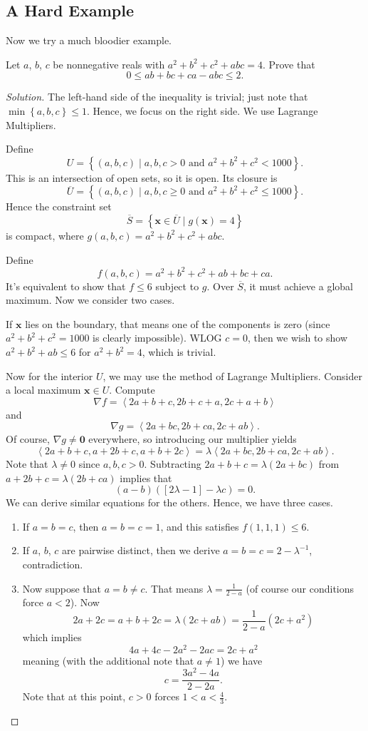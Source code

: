 \documentclass[11pt]{scrartcl}
\begin{document}
\subsection{A Hard Example}
Now we try a much bloodier example.
\begin{example}
  [USAMO 2001/3] Let $a$, $b$, $c$ be nonnegative
  reals with $a^2+b^2+c^2+abc=4$.
  Prove that
  \[ 0 \le ab + bc + ca - abc \le 2. \]
\end{example}

\begin{proof}[Solution]
The left-hand side of the inequality is trivial;
just note that $\min \left\{ a,b,c \right\} \le 1$.
Hence, we focus on the right side.
We use Lagrange Multipliers.

Define \[ U = \left\{ (a,b,c) \mid a,b,c > 0
  \text{ and } a^2+b^2+c^2 < 1000 \right\}. \]
This is an intersection of open sets, so it is open.
Its closure is
\[ \overline U = \left\{ (a,b,c) \mid a,b,c \ge 0
\text{ and } a^2+b^2+c^2 \le 1000 \right\}. \]
Hence the constraint set
\[ \overline S = \left\{ \mathbf{x} \in \overline U \mid g(\mathbf{x}) = 4 \right\} \]
is compact, where $g(a,b,c) = a^2+b^2+c^2+abc$.

Define \[ f(a,b,c) = a^2+b^2+c^2+ab+bc+ca. \]
It's equivalent to show that $f \le 6$ subject to $g$.
Over $\overline S$, it must achieve a global maximum.
Now we consider two cases.

If $\mathbf{x}$ lies on the boundary,
that means one of the components is zero
(since $a^2+b^2+c^2=1000$ is clearly impossible).
WLOG $c=0$, then we wish to show $a^2+b^2+ab \le 6$
for $a^2+b^2=4$, which is trivial.

Now for the interior $U$, we may use the method of Lagrange Multipliers.
Consider a local maximum $\mathbf{x} \in U$.
Compute \[ \nabla f = \left<2a+b+c, 2b+c+a, 2c+a+b \right> \]
and \[ \nabla g = \left<2a+bc, 2b+ca, 2c+ab\right>. \]
Of course, $\nabla g \neq \mathbf{0}$ everywhere,
so introducing our multiplier yields
\[ \left<2a+b+c,a+2b+c,a+b+2c\right> = \lambda \left<2a+bc,2b+ca,2c+ab\right>. \]
Note that $\lambda \neq 0$ since $a,b,c > 0$.
Subtracting $2a+b+c = \lambda(2a+bc)$ from $a+2b+c = \lambda(2b+ca)$
implies that \[ (a-b)(\left[ 2\lambda - 1 \right] - \lambda c) = 0. \]
We can derive similar equations for the others.
Hence, we have three cases.
\begin{enumerate}
  \item If $a=b=c$, then $a=b=c=1$, and this satisfies $f(1,1,1) \le 6$.
  \item If $a$, $b$, $c$ are pairwise distinct,
  then we derive $a = b = c = 2 - \lambda^{-1}$, contradiction.
  \item Now suppose that $a=b \neq c$.
  That means $\lambda = \frac{1}{2-a}$
  (of course our conditions force $a < 2$).
  Now \[ 2a+2c = a+b+2c = \lambda (2c+ab) = \frac{1}{2-a} (2c+a^2) \]
  which implies \[ 4a+4c-2a^2-2ac = 2c+a^2 \] meaning
  (with the additional note that $a \neq 1$) we have \[ c =
  \frac{3a^2-4a}{2-2a}. \]
  Note that at this point, $c > 0$ forces $1 < a < \frac 43$.
\end{enumerate}


\end{proof}
\end{document}
